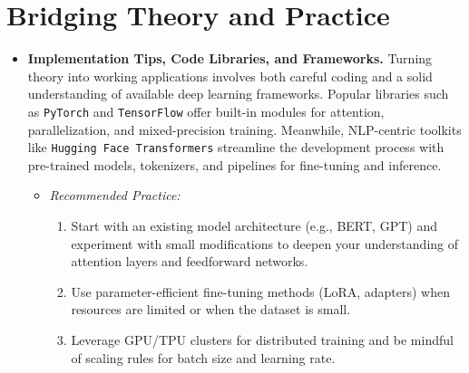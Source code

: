 \section{Bridging Theory and Practice}
\label{sec:bridging_theory_practice}
\begin{itemize}
    \item \textbf{Implementation Tips, Code Libraries, and Frameworks.} 
    Turning theory into working applications involves both careful coding and a solid understanding of available deep learning frameworks. Popular libraries such as \texttt{PyTorch} and \texttt{TensorFlow} offer built-in modules for attention, parallelization, and mixed-precision training. Meanwhile, NLP-centric toolkits like \texttt{Hugging Face Transformers} streamline the development process with pre-trained models, tokenizers, and pipelines for fine-tuning and inference.
    \begin{itemize}
        \item \textit{Recommended Practice:} 
        \begin{enumerate}
            \item Start with an existing model architecture (e.g., BERT, GPT) and experiment with small modifications to deepen your understanding of attention layers and feedforward networks.
            \item Use parameter-efficient fine-tuning methods (LoRA, adapters) when resources are limited or when the dataset is small.
            \item Leverage GPU/TPU clusters for distributed training and be mindful of scaling rules for batch size and learning rate.
        \end{enumerate}
    \end{itemize}
\end{itemize}

